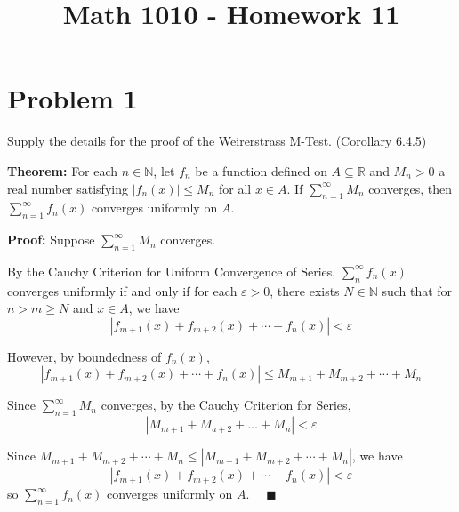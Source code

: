 \documentclass[12pt]{article}
\title{Math 1010 - Homework 11}
\author{}
\date{}
\newcommand{\R}{\mathbb{R}}
\newcommand{\N}{\mathbb{N}}
\newcommand{\qed}{\quad \blacksquare}
\newcommand{\abs}[1]{\left\vert #1 \right\vert}
\newcommand{\ep}{\varepsilon}
\begin{document}
\maketitle
\vspace*{-1in}


\section*{Problem 1 }
Supply the details for the proof of the Weirerstrass M-Test. (Corollary 6.4.5)

    \color{blue}
        \textbf{Theorem:} For each $n \in \N$, let $f_n$ be a function defined on $A \subseteq \R$ and $M_n > 0$ a real number satisfying $\abs{f_n(x)} \leq M_n$ for all $x \in A$. If $\sum_{n=1}^{\infty} M_n$ converges, then $\sum_{n=1}^{\infty} f_n(x)$ converges uniformly on $A$.

        \textbf{Proof:} Suppose $\sum_{n=1}^{\infty} M_n$ converges. 
        
        By the Cauchy Criterion for Uniform Convergence of Series, $\sum_n^{\infty} f_n(x)$ converges uniformly if and only if for each $\ep > 0$, there exists $N \in \N$ such that for $n > m \geq N$ and $x \in A$, we have
        \[\abs{f_{m+1}(x) + f_{m+2}(x) + \cdots + f_n(x)} < \ep\] 

        However, by boundedness of $f_n(x)$, 
        \[\abs{f_{m+1}(x) + f_{m+2}(x) + \cdots + f_n(x)} \leq M_{m+1} + M_{m+2} + \cdots + M_n\]

        Since $\sum_{n=1}^{\infty} M_n$ converges, by the Cauchy Criterion for Series, 
        \[\abs{M_{m+1} + M_{a+2} + \dots + M_n} < \ep\]

        Since $M_{m+1} + M_{m+2} + \cdots + M_n \leq \abs{M_{m+1} + M_{m+2} + \cdots + M_n}$, we have
        \[\abs{f_{m+1}(x) + f_{m+2}(x) + \cdots + f_n(x)} < \ep\]
        so $\sum_{n=1}^{\infty} f_n(x)$ converges uniformly on $A$. $\qed$
    \color{black}

\pagebreak
\end{document}
